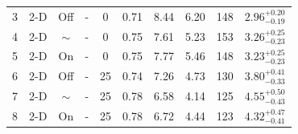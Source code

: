 \begin{table}[]
\begin{tabular}{cccccccccc}
        3   & 2-D  & Off    & -         & 0                                                                 & 0.71                                                            & 8.44                                                                  & 6.20                                                             & 148                                                       & $2.96_{-0.19}^{+0.20}$ \\
        4   & 2-D  & $\sim$ & -         & 0                                                                 & 0.75                                                            & 7.61                                                                  & 5.23                                                             & 153                                                       & $3.26_{-0.23}^{+0.25}$ \\
        5   & 2-D  & On     & -         & 0                                                                 & 0.75                                                            & 7.77                                                                  & 5.46                                                             & 148                                                       & $3.23_{-0.23}^{+0.25}$ \\
        6   & 2-D  & Off    & -         & 25                                                                & 0.74                                                            & 7.26                                                                  & 4.73                                                             & 130                                                       & $3.80_{-0.33}^{+0.41}$ \\
        7   & 2-D  & $\sim$ & -         & 25                                                                & 0.78                                                            & 6.58                                                                  & 4.14                                                             & 125                                                       & $4.55_{-0.43}^{+0.50}$ \\
        8   & 2-D  & On     & -         & 25                                                                & 0.78                                                            & 6.72                                                                  & 4.44                                                             & 123                                                       & $4.32_{-0.41}^{+0.47}$ \\

\end{tabular}
\end{table}
